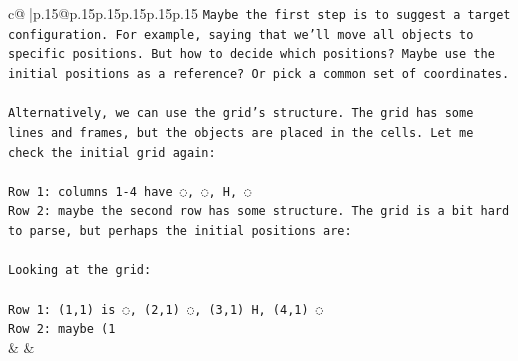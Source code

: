 \documentclass{article}
\begin{document}
{\begin{supertabular}{c@{$\;$}|p{.15\linewidth}@{}p{.15\linewidth}p{.15\linewidth}p{.15\linewidth}p{.15\linewidth}p{.15\linewidth}}
{{{\texttt{Maybe the first step is to suggest a target configuration. For example, saying that we'll move all objects to specific positions. But how to decide which positions? Maybe use the initial positions as a reference? Or pick a common set of coordinates.} \\
\\ 
\texttt{Alternatively, we can use the grid's structure. The grid has some lines and frames, but the objects are placed in the cells. Let me check the initial grid again:} \\
\\ 
\texttt{Row 1: columns 1{-}4 have ◌, ◌, H, ◌} \\
\texttt{Row 2: maybe the second row has some structure. The grid is a bit hard to parse, but perhaps the initial positions are:} \\
\\ 
\texttt{Looking at the grid:} \\
\\ 
\texttt{Row 1: (1,1) is ◌, (2,1) ◌, (3,1) H, (4,1) ◌} \\
\texttt{Row 2: maybe (1} \\
            }
        }
    }
    & & \\ \\


\end{supertabular}}
\end{document}
